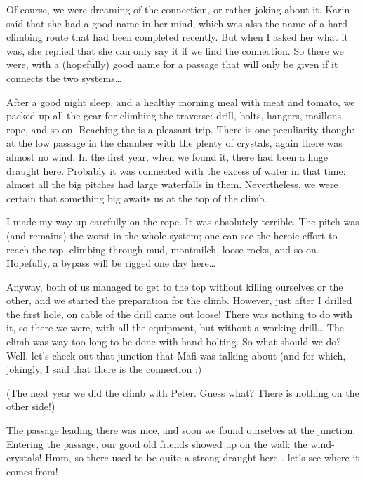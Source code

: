 Of course, we were dreaming of the connection, or rather joking about
it. Karin said that she had a good name in her mind, which was also the
name of a hard climbing route that had been completed recently. But when
I asked her what it was, she replied that she can only say it if we find
the connection. So there we were, with a (hopefully) good name for a
passage that will only be given if it connects the two systems\ldots{}

After a good night sleep, and a healthy morning meal with meat and
tomato, we packed up all the gear for climbing the traverse: drill,
bolts, hangers, maillons, rope, and so on. Reaching the  is a pleasant trip. There is one peculiarity though: at the
low passage in the chamber with the plenty of crystals, again there was
almost no wind. In the first year, when we found it, there had been a
huge draught here. Probably it was connected with the excess of water in
that time: almost all the big pitches had large waterfalls in them.
Nevertheless, we were certain that something big awaits us at the top of
the  climb.

I made my way up carefully on the rope. It was absolutely terrible. The
pitch was (and remains) the worst in the whole system; one can see the
heroic effort to reach the top, climbing through mud, montmilch, loose
rocks, and so on. Hopefully, a bypass will be rigged one day
here\ldots{}

Anyway, both of us managed to get to the top without killing ourselves
or the other, and we started the preparation for the climb. However,
just after I drilled the first hole, on cable of the drill came out
loose! There was nothing to do with it, so there we were, with all the
equipment, but without a working drill\ldots{} The climb was way too
long to be done with hand bolting. So what should we do? Well, let's
check out that junction that Mafi was talking about (and for which,
jokingly, I said that there is the connection :)

(The next year we did
the climb with Peter. Guess what? There is nothing on the other side!)

The passage leading there was nice, and soon we found ourselves at the
junction. Entering the passage, our good old friends showed up on the
wall: the wind-crystals! Hmm, so there used to be quite a strong draught
here\ldots{} let's see where it comes from!

